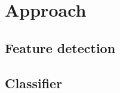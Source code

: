 \chapter{Approach}\label{cha:approach}

\section{Feature detection}\label{sec:feature_detection}



\section{Classifier}\label{sec:classifier}


